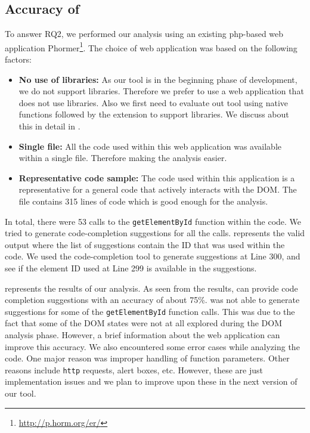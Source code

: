 	\subsection{Accuracy of \dompletion}
	\label{Sec:Accuracy}
	To answer RQ2, we performed our analysis using an existing php-\javascript based web application Phormer\footnote{\url{http://p.horm.org/er/}}. The choice of web application was based on the following factors:
	\begin{itemize}
		\item \textbf{No use of \javascript libraries:} As our tool \dompletion is in the beginning phase of development, we do not support \javascript libraries. Therefore we prefer to use a web application that does not use libraries. Also we first need to evaluate out tool using native \javascript functions followed by the extension to support \javascript libraries. We discuss about this in detail in .
		
		\item \textbf{Single \javascript file:} All the \javascript code used within this web application was available within a single \javascript file. Therefore making the analysis easier.
		
		\item \textbf{Representative code sample:} The \javascript code used within this application is a representative for a general \javascript code that actively interacts with the DOM. The \javascript file contains 315 lines of code which is good enough for the analysis.
		
	\end{itemize}
	
	In total, there were 53 calls to the \texttt{getElementById} function within the \javascript code. We tried to generate code-completion suggestions for all the calls.     represents the valid output where the list of suggestions contain the ID that was used within the code. We used the code-completion tool to generate suggestions at Line 300, and see if the element ID used at Line 299 is available in the suggestions. 
	
	 represents the results of our analysis. As seen from the results, \dompletion can provide code completion suggestions with an accuracy of about 75\%. \dompletion was not able to generate suggestions for some of the \texttt{getElementById} function calls. This was due to the fact that some of the DOM states were not at all explored during the DOM analysis phase. However, a brief information about the web application can improve this accuracy. We also encountered some error cases while analyzing the code. One major reason was improper handling of function parameters. Other reasons include \texttt{http} requests, alert boxes, etc. However, these are just implementation issues and we plan to improve upon these in the next version of our tool.
	
